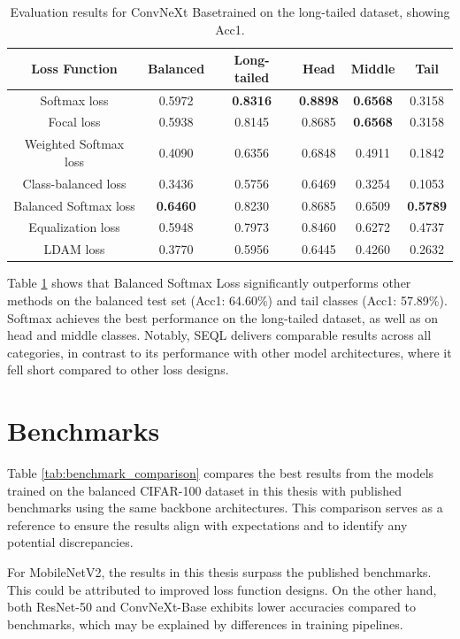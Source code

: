 \begin{table}[h!]
    \centering
    \caption{Evaluation results for ConvNeXt Basetrained on the long-tailed dataset, showing Acc1.}
    \begin{tabular}{cccccc}
        \toprule
        Loss Function & Balanced & Long-tailed & Head & Middle & Tail \\ 
        \midrule
        Softmax loss   & 0.5972 & \textbf{0.8316} & \textbf{0.8898} & \textbf{0.6568} & 0.3158 \\
        Focal loss   & 0.5938 & 0.8145 & 0.8685 & \textbf{0.6568} & 0.3158 \\
        Weighted Softmax loss   & 0.4090 & 0.6356 & 0.6848 & 0.4911 & 0.1842 \\
        Class-balanced loss   & 0.3436 & 0.5756 & 0.6469 & 0.3254 & 0.1053 \\
        Balanced Softmax loss   & \textbf{0.6460} & 0.8230 & 0.8685 & 0.6509 & \textbf{0.5789} \\
        Equalization loss   & 0.5948 & 0.7973 & 0.8460 & 0.6272 & 0.4737 \\
        LDAM loss   & 0.3770 & 0.5956 & 0.6445 & 0.4260 & 0.2632 \\
        \bottomrule
    \end{tabular}
    \label{tab:conv_lt_acc1_1}
\end{table}

Table \ref{tab:conv_lt_acc1_1} shows that Balanced Softmax Loss significantly outperforms other methods on the balanced test set (Acc1: 64.60\%) and tail classes (Acc1: 57.89\%). Softmax achieves the best performance on the long-tailed dataset, as well as on head and middle classes. Notably, SEQL delivers comparable results across all categories, in contrast to its performance with other model architectures, where it fell short compared to other loss designs.

\section{Benchmarks}
Table \ref{tab:benchmark_comparison} compares the best results from the models trained on the balanced CIFAR-100 dataset in this thesis with published benchmarks using the same backbone architectures. This comparison serves as a reference to ensure the results align with expectations and to identify any potential discrepancies. 

For MobileNetV2, the results in this thesis surpass the published benchmarks. This could be attributed to improved loss function designs. On the other hand, both ResNet-50 and ConvNeXt-Base exhibits lower accuracies compared to benchmarks, which may be explained by differences in training pipelines.

